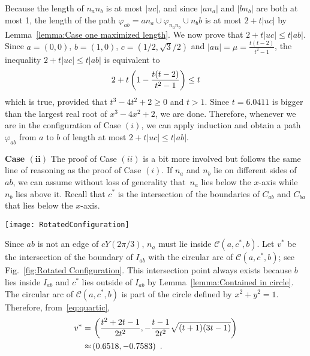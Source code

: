 \documentclass{cccg14}
\newcommand{\cyaoOneTwenty}{\ensuremath{cY(2\pi/3)}\xspace}
\newcommand{\creflect}{\ensuremath{c^*}\xspace}
\newcommand{\vreflect}{\ensuremath{v^*}\xspace}
\newcommand{\spanningRationCyao}{\ensuremath{6.0411}\xspace}
\begin{document}
Because the length of $n_an_b$ is at most $|uc|$, and since $|an_a|$ and $|bn_b|$ are both at most 1,
the length of the path $\varphi_{ab} = an_a\cup \varphi_{n_an_b}\cup n_b b$ is at most $2+ t|uc|$
by Lemma~\ref{lemma:Case one maximized length}. 
We now prove that $2+ t|uc|\leq t|ab|$.
Since $a=(0,0)$, $b=(1,0)$, $c=(1/2,\sqrt{3}/2)$
and $|au| = \mu = \frac{t(t-2)}{t^2-1}$,
 the inequality $2+t|uc| \leq t|ab|$ is equivalent to 
  \vspace{-.1in}
 \begin{equation*} 
2+ t\left(1-\frac{t(t-2)}{t^2-1}\right) \leq t
 \vspace{-.1in}
\end{equation*}
which is true,
provided that
$t^3 -4t^2+2 \geq 0$ and $t>1$.
Since $t = \spanningRationCyao$ is bigger than the largest real root of $x^3 -4x^2+2$,
we are done.
Therefore,
whenever we are in the configuration of Case $(i)$,
we can apply induction and obtain a path $\varphi_{ab}$ from $a$ to $b$ of length at most $2 + t|uc| \leq t|ab|$.\vspace{.05in}

\textbf{Case $\boldsymbol{(ii)}$} The proof of Case $(ii)$ is a bit more involved but follows the same line of reasoning as the proof of Case $(i)$.
If $n_a$ and $n_b$ lie on different sides of $ab$, we can assume without loss of generality that~$n_a$ lies below the $x$-axis while $n_b$ lies above it.
Recall that $\creflect$ is the intersection of the boundaries of $C_{ab}$ and $C_{ba}$ that lies below the $x$-axis.

\begin{figure*}[htb]
\centering
\texttt{[image: RotatedConfiguration]}
\vspace{-0.5em}
\caption{\small a) Point $\vreflect$ and angle $\psi = \angle \vreflect a \creflect$ b) Cone $C'_{ab}$ is obtained by rotating $C_{ab}$ counter-clockwise $\psi$ degrees.}
\vspace{-0.5em}
\label{fig:Rotated Configuration}
\end{figure*}

Since $ab$ is not an edge of \cyaoOneTwenty,
$n_a$ must lie inside $\mathcal{C}(a,\creflect,b)$.
Let $\vreflect$ be the intersection of the boundary of $I_{ab}$ with the circular arc of $\mathcal{C}(a,\creflect,b)$; see Fig.~\ref{fig:Rotated Configuration}.
This intersection point always exists because
$b$ lies inside $I_{ab}$
and $\creflect$ lies outside of $I_{ab}$ by Lemma~\ref{lemma:Contained in circle}.
The circular arc of $\mathcal{C}(a,\creflect,b)$ is part of the circle defined by $x^2+y^2 = 1$.
Therefore,
from~\eqref{eq:quartic},
 \vspace{-.07in}
\begin{align}
\label{expression vreflect}
\vreflect =& \, \left(\frac{t^2+2t-1}{2t^2},-\frac{t-1}{2t^2}\sqrt{(t+1)(3t-1)}\right) \\
\nonumber
\approx& \, (0.6518, -0.7583) \enspace.
\vspace{-.1in}
\end{align}
\end{document}
